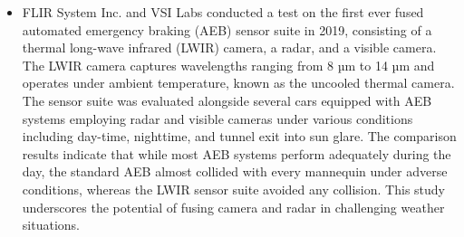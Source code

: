 \documentclass[rnd]{mas_proposal}
\begin{document}
\begin{itemize}
      \item FLIR System Inc. \cite{fused_aeb} and VSI Labs \cite{VSILabs} conducted a test on the first ever fused automated emergency braking (AEB) sensor suite in 2019, consisting of a thermal long-wave infrared (LWIR) camera, a radar, and a visible camera. The LWIR camera captures wavelengths ranging from 8 µm to 14 µm and operates under ambient temperature, known as the uncooled thermal camera. The sensor suite was evaluated alongside several cars equipped with AEB systems employing radar and visible cameras under various conditions including day-time, nighttime, and tunnel exit into sun glare. The comparison results indicate that while most AEB systems perform adequately during the day, the standard AEB almost collided with every mannequin under adverse conditions, whereas the LWIR sensor suite avoided any collision. This study underscores the potential of fusing camera and radar in challenging weather situations.
      

\end{itemize}
\end{document}
